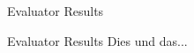\begin{frame}[standout]
    Evaluator Results
\end{frame}

\begin{frame}{Evaluator Results}
    Dies und das...
\end{frame}
